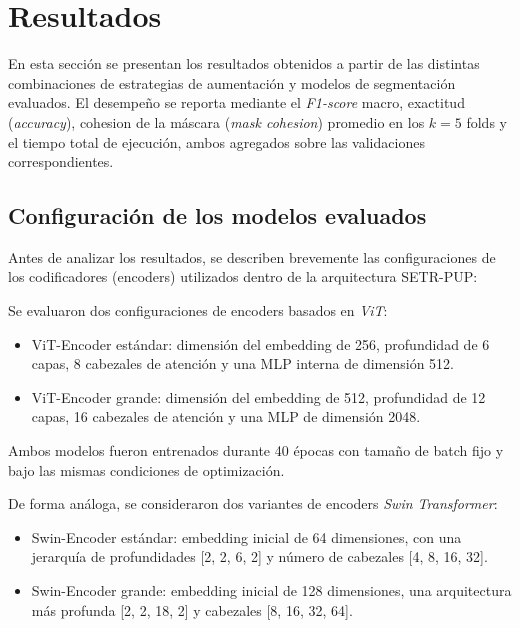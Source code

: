 \documentclass[onecolumn, 12pt , journal]{IEEEtran}
\begin{document}

\section{Resultados}

En esta sección se presentan los resultados obtenidos a partir de las distintas combinaciones de estrategias de aumentación y modelos de segmentación evaluados. El desempeño se reporta mediante el \emph{F1-score} macro, exactitud (\emph{accuracy}), cohesion de la máscara (\emph{mask cohesion}) promedio en los $k=5$ folds y el tiempo total de ejecución, ambos agregados sobre las validaciones correspondientes.

\subsection{Configuración de los modelos evaluados}

Antes de analizar los resultados, se describen brevemente las configuraciones de los codificadores (encoders) utilizados dentro de la arquitectura SETR-PUP:

Se evaluaron dos configuraciones de encoders basados en \emph{ViT}:

\begin{itemize}
\item ViT-Encoder estándar: dimensión del embedding de 256, profundidad de 6 capas, 8 cabezales de atención y una MLP interna de dimensión 512.
\item ViT-Encoder grande: dimensión del embedding de 512, profundidad de 12 capas, 16 cabezales de atención y una MLP de dimensión 2048.
\end{itemize}

Ambos modelos fueron entrenados durante 40 épocas con tamaño de batch fijo y bajo las mismas condiciones de optimización.

De forma análoga, se consideraron dos variantes de encoders \emph{Swin Transformer}:

\begin{itemize}
\item Swin-Encoder estándar: embedding inicial de 64 dimensiones, con una jerarquía de profundidades [2, 2, 6, 2] y número de cabezales [4, 8, 16, 32].
\item Swin-Encoder grande: embedding inicial de 128 dimensiones, una arquitectura más profunda [2, 2, 18, 2] y cabezales [8, 16, 32, 64].
\end{itemize}
\end{document}
